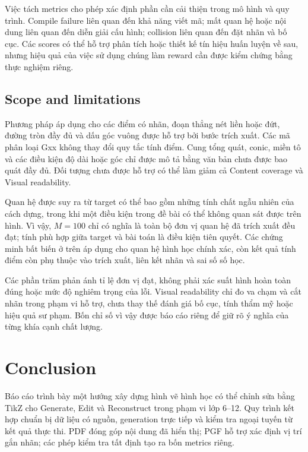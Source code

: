 \documentclass[a4paper,12pt]{article}
\begin{document}
Việc tách metrics cho phép xác định phần cần cải thiện trong mô hình và quy trình. Compile failure liên quan đến khả năng viết mã; mất quan hệ hoặc nội dung liên quan đến diễn giải cấu hình; collision liên quan đến đặt nhãn và bố cục. Các scores có thể hỗ trợ phân tích hoặc thiết kế tín hiệu huấn luyện về sau, nhưng hiệu quả của việc sử dụng chúng làm reward cần được kiểm chứng bằng thực nghiệm riêng.

\subsection{Scope and limitations}

Phương pháp áp dụng cho các điểm có nhãn, đoạn thẳng nét liền hoặc đứt, đường tròn đầy đủ và dấu góc vuông được hỗ trợ bởi bước trích xuất. Các mã phân loại Gxx không thay đổi quy tắc tính điểm. Cung tổng quát, conic, miền tô và các điều kiện độ dài hoặc góc chỉ được mô tả bằng văn bản chưa được bao quát đầy đủ. Đối tượng chưa được hỗ trợ có thể làm giảm cả Content coverage và Visual readability.

Quan hệ được suy ra từ target có thể bao gồm những tính chất ngẫu nhiên của cách dựng, trong khi một điều kiện trong đề bài có thể không quan sát được trên hình. Vì vậy, $M=100$ chỉ có nghĩa là toàn bộ đơn vị quan hệ đã trích xuất đều đạt; tính phù hợp giữa target và bài toán là điều kiện tiên quyết. Các chứng minh bất biến ở trên áp dụng cho quan hệ hình học chính xác, còn kết quả tính điểm còn phụ thuộc vào trích xuất, liên kết nhãn và sai số số học.

Các phần trăm phản ánh tỉ lệ đơn vị đạt, không phải xác suất hình hoàn toàn đúng hoặc mức độ nghiêm trọng của lỗi. Visual readability chỉ đo va chạm và cắt nhãn trong phạm vi hỗ trợ, chưa thay thế đánh giá bố cục, tính thẩm mỹ hoặc hiệu quả sư phạm. Bốn chỉ số vì vậy được báo cáo riêng để giữ rõ ý nghĩa của từng khía cạnh chất lượng.

\section{Conclusion}
\label{sec:conclusion}
Báo cáo trình bày một hướng xây dựng hình vẽ hình học có thể chỉnh sửa bằng TikZ cho Generate, Edit và Reconstruct trong phạm vi lớp 6--12. Quy trình kết hợp chuẩn bị dữ liệu có nguồn, generation trực tiếp và kiểm tra ngoại tuyến từ kết quả thực thi. PDF đóng góp nội dung đã hiển thị; PGF hỗ trợ xác định vị trí gắn nhãn; các phép kiểm tra tất định tạo ra bốn metrics riêng.
\end{document}
